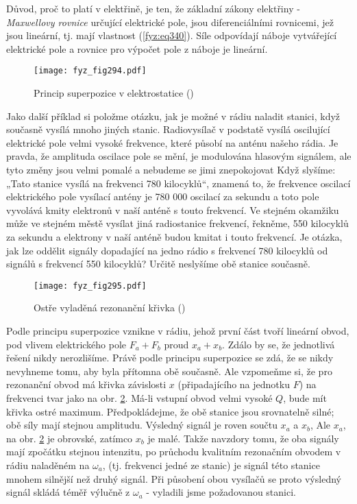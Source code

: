     Důvod, proč to platí v elektřině, je ten, že základní zákony elektřiny - \emph{Maxwellovy 
    rovnice} určující elektrické pole, jsou diferenciálními rovnicemi, jež jsou lineární, tj. mají 
    vlastnost (\ref{fyz:eq340}). Síle odpovídají náboje vytvářející elektrické pole a rovnice pro 
    výpočet pole z náboje je lineární. 

    \begin{figure}[ht!] %
      \centering
      \texttt{[image: fyz\_fig294.pdf]}
      \caption{Princip superpozice v elektrostatice
               (\cite[s.~335]{Feynman01})}
      \label{fyz:fig294}
    \end{figure}
    
    Jako další příklad si položme otázku, jak je možné v rádiu naladit stanici, když současně 
    vysílá mnoho jiných stanic. Radiovysílač v podstatě vysílá oscilující elektrické pole velmi 
    vysoké frekvence, které působí na anténu našeho rádia. Je pravda, že amplituda oscilace pole se 
    mění, je modulována hlasovým signálem, ale tyto změny jsou velmi pomalé a nebudeme se jimi 
    znepokojovat Když slyšíme: „Tato stanice vysílá na frekvenci 780 kilocyklů“, znamená to, že 
    frekvence oscilací elektrického pole vysílací antény je 780 000 oscilací za sekundu a toto pole 
    vyvolává kmity elektronů v naší anténě s touto frekvencí. Ve stejném okamžiku může ve stejném 
    městě vysílat jiná radiostanice frekvencí, řekněme, 550 kilocyklů za sekundu a elektrony v naší 
    anténě budou kmitat i touto frekvencí. Je otázka, jak lze oddělit signály dopadající na jedno 
    rádio s frekvencí 780 kilocyklů od signálů s frekvencí 550 kilocyklů? Určitě neslyšíme obě 
    stanice současně. 
    
    \begin{figure}[ht!] %
      \centering
      \texttt{[image: fyz\_fig295.pdf]}
      \caption{Ostře vyladěná rezonanční křivka
               (\cite[s.~335]{Feynman01})}
      \label{fyz:fig295}
    \end{figure}
    
    Podle principu superpozice vznikne v rádiu, jehož první část tvoří lineární obvod, pod vlivem 
    elektrického pole \(F_a + F_b\) proud \(x_a + x_b\). Zdálo by se, že jednotlivá řešení nikdy 
    nerozlišíme. Právě podle principu superpozice se zdá, že se nikdy nevyhneme tomu, aby byla 
    přítomna obě současně. Ale vzpomeňme si, že pro rezonanční obvod má křivka závislosti \(x\) 
    (připadajícího na jednotku \(F\)) na frekvenci tvar jako na obr. \ref{fyz:fig295}. Má-li 
    vstupní obvod velmi vysoké \(Q\), bude mít křivka ostré maximum. Předpokládejme, že obě stanice 
    jsou srovnatelně silné; obě síly mají stejnou amplitudu. Výsledný signál je roven součtu 
    \(x_a\) a \(x_b\), Ale \(x_a\), na obr. \ref{fyz:fig295} je obrovské, zatímco \(x_b\) je malé. 
    Takže navzdory tomu, že oba signály mají zpočátku stejnou intenzitu, po průchodu kvalitním 
    rezonačním obvodem v rádiu naladěném na \(\omega_a\), (tj. frekvenci jedné ze stanic) je signál 
    této stanice mnohem silnější než druhý signál. Při působení obou vysílačů se proto výsledný 
    signál skládá téměř výlučně z \(\omega_a\) - vyladili jsme požadovanou stanici.
    
